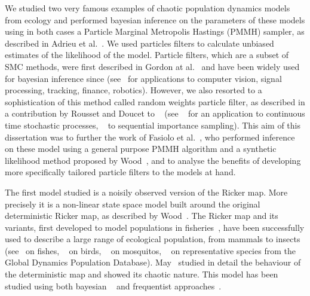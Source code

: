 \documentclass[12pt]{article}
\begin{document}
	We studied two very famous examples of chaotic population dynamics models from ecology and performed bayesian inference on the parameters of these models using in both cases a Particle Marginal Metropolis Hastings (PMMH) sampler, as described in Adrieu et al.~\cite{andrieu2010particle}. We used particles filters to calculate unbiased estimates of the likelihood of the model. Particle filters, which are a subset of SMC methods, were first described in Gordon at al.~\cite{gordon1993novel} and have been widely used for bayesian inference since (see~\cite{ristic2004beyond, cappe2006inference, smith2013sequential, liu2008monte} for applications to computer vision, signal processing, tracking, finance, robotics). However, we also resorted to a sophistication of this method called random weights particle filter, as described in a contribution by Rousset and Doucet to ~\cite{beskos2006exact} (see ~\cite{fearnhead2010random} for an application to continuous time stochastic processes, ~\cite{fearnhead2008particle} to sequential importance sampling). This aim of this dissertation was to further the work of Fasiolo et al.~\cite{fasiolo2014statistical}, who performed inference on these model using a general purpose PMMH algorithm and a synthetic likelihood method proposed by Wood~\cite{wood2010statistical}, and to analyse the benefits of developing more specifically tailored particle filters to the models at hand.
	
	The first model studied is a noisily observed version of the Ricker map. More precisely it is a non-linear state space model built around the original deterministic Ricker map, as described by Wood~\cite{wood2010statistical}. The Ricker map and its variants, first developed to model populations in fisheries~\cite{Ricker1954}, have been successfully used to describe a large range of ecological population, from mammals to insects (see~\cite{myers1999maximum, mueter2002opposite, krkovsek2007declining} on fishes, ~\cite{polansky2009likelihood, saether2002pattern} on birds, ~\cite{yang2008importance} on mosquitos, ~\cite{sibly2005regulation} on representative species from the Global Dynamics Population Database). May~\cite{may1975biological} studied in detail the behaviour of the deterministic map and showed its chaotic nature. This model has been studied using both bayesian ~\cite{wood2010statistical, gao2012bayesian, fasiolo2014statistical} and frequentist approaches~\cite{sibly2005regulation, yang2008importance, polansky2009likelihood}.
	
\end{document}
